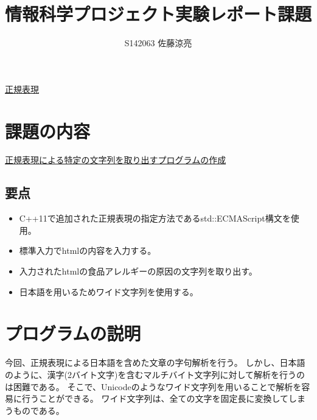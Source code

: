 \documentclass[a4j]{jarticle}
\title{情報科学プロジェクト実験レポート課題}
\author{S142063 佐藤涼亮}
\begin{document}
\maketitle
\begin{center}
{\LARGE \underline{正規表現}}
\end{center}
\section{課題の内容}
{\large \underline{正規表現による特定の文字列を取り出すプログラムの作成}}
\subsection{要点}
\begin{itemize}
\item C++11で追加された正規表現の指定方法であるstd::ECMAScript構文を使用。
\item 標準入力でhtmlの内容を入力する。
\item 入力されたhtmlの食品アレルギーの原因の文字列を取り出す。
\item 日本語を用いるためワイド文字列を使用する。
\end{itemize}
\section{プログラムの説明}
今回、正規表現による日本語を含めた文章の字句解析を行う。
しかし、日本語のように、漢字(2バイト文字)を含むマルチバイト文字列に対して解析を行うのは困難である。
そこで、Unicodeのようなワイド文字列を用いることで解析を容易に行うことができる。
ワイド文字列は、全ての文字を固定長に変換してしまうものである。
\newpage
\end{document}
